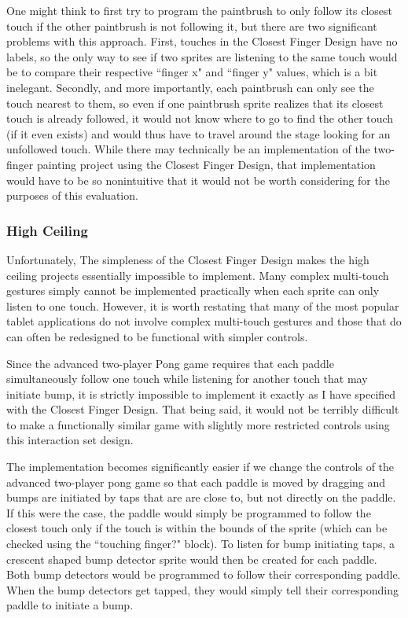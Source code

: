 One might think to first try to program the paintbrush to only follow its closest touch if the other paintbrush is not following it, but there are two significant problems with this approach. First, touches in the Closest Finger Design have no labels, so the only way to see if two sprites are listening to the same touch would be to compare their respective ``finger x" and ``finger y" values, which is a bit inelegant. Secondly, and more importantly, each paintbrush can only see the touch nearest to them, so even if one paintbrush sprite realizes that its closest touch is already followed, it would not know where to go to find the other touch (if it even exists) and would thus have to travel around the stage looking for an unfollowed touch. While there may technically be an implementation of the two-finger painting project using the Closest Finger Design, that implementation would have to be so nonintuitive that it would not be worth considering for the purposes of this evaluation.

\subsubsection{High Ceiling}

Unfortunately, The simpleness of the Closest Finger Design makes the high ceiling projects essentially impossible to implement. Many complex multi-touch gestures simply cannot be implemented practically when each sprite can only listen to one touch. However, it is worth restating that many of the most popular tablet applications do not involve complex multi-touch gestures and those that do can often be redesigned to be functional with simpler controls.

Since the advanced two-player Pong game requires that each paddle simultaneously follow one touch while listening for another touch that may initiate bump, it is strictly impossible to implement it exactly as I have specified with the Closest Finger Design. That being said, it would not be terribly difficult to make a functionally similar game with slightly more restricted controls using this interaction set design. 

The implementation becomes significantly easier if we change the controls of the advanced two-player pong game so that each paddle is moved by dragging and bumps are initiated by taps that are are close to, but not directly on the paddle. If this were the case, the paddle would simply be programmed to follow the closest touch only if the touch is within the bounds of the sprite (which can be checked using the ``touching finger?" block). To listen for bump initiating taps, a crescent shaped bump detector sprite would then be created for each paddle. Both bump detectors would be programmed to follow their corresponding paddle. When the bump detectors get tapped, they would simply tell their corresponding paddle to initiate a bump.

